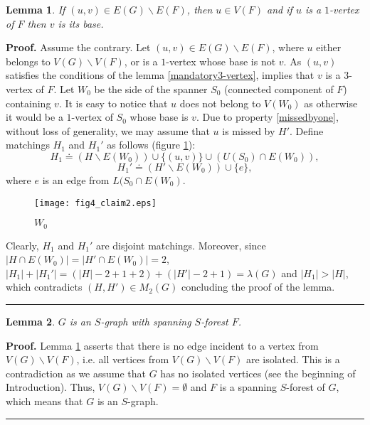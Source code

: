 \documentclass[a4paper, 12pt]{article}
\newtheorem{lemma}{Lemma}[subsection]
\newenvironment{proof}[1][Proof]{\noindent\textbf{#1.} }{\ \rule{0.5em}{0.5em}}
\begin{document}
\begin{lemma}\label{cannotbe3-vertex}
If $(u,v) \in E(G) \backslash E(F)$, then $u \in V(F)$ and if $u$ is
a $1$-vertex of $F$ then $v$ is its base.
\end{lemma}
\begin{proof}
Assume the contrary. Let $(u,v) \in E(G) \backslash E(F)$, where $u$
either belongs to $V(G) \backslash V(F)$, or is a $1$-vertex whose
base is not $v$. As $(u,v)$ satisfies the conditions of the lemma
\ref{mandatory3-vertex}, implies that $v$ is a $3$-vertex of $F$.
Let $W_0$ be the side of the spanner $S_0$ (connected component of
$F$) containing $v$. It is easy to notice that $u$ does not belong
to $V(W_0)$ as otherwise it would be a $1$-vertex of $S_0$ whose
base is $v$. Due to property \ref{missedbyone}, without loss of
generality, we may assume that $u$ is missed by $H'$. Define
matchings $H_1$ and $H_1'$ as follows (figure
\ref{fig_claim_cannotbe3-vertex}):
$$H_1 \doteq (H \backslash E(W_0)) \cup \{ (u,v) \} \cup
(U(S_0) \cap E(W_0)),$$
$$H_1' \doteq (H' \backslash E(W_0)) \cup \{ e \},$$
where $e$ is an edge from $L(S_0 \cap E(W_0)$.

\begin{figure}[h]
\begin{center}
\texttt{[image: fig4\_claim2.eps]}\\
\caption{$W_0$}\label{fig_claim_cannotbe3-vertex}
\end{center}
\end{figure}

Clearly, $H_1$ and $H_1'$ are disjoint matchings. Moreover, since
$|H \cap E(W_0)| = |H' \cap E(W_0)| = 2$, $|H_1| + |H_1'| = (|H| - 2
+ 1 + 2) + (|H'| - 2 + 1) = \lambda(G)$ and $|H_1| > |H|$, which
contradicts $(H,H') \in M_2(G)$ concluding the proof of the lemma.
\end{proof}

\begin{lemma} \label{S-graph}
$G$ is an $S$-graph with spanning $S$-forest $F$.
\end{lemma}
\begin{proof}
Lemma \ref{cannotbe3-vertex} asserts that there is no edge incident
to a vertex from $V(G) \backslash V(F)$, i.e. all vertices from
$V(G) \backslash V(F)$ are isolated. This is a contradiction as we
assume that $G$ has no isolated vertices (see the beginning of
Introduction). Thus, $V(G) \backslash V(F) = \emptyset$ and $F$ is a
spanning $S$-forest of $G$, which means that $G$ is an $S$-graph.
\end{proof}
\end{document}
